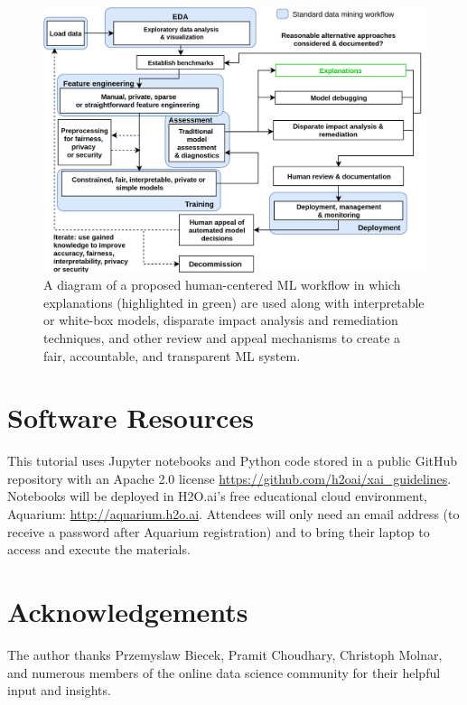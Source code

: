 \documentclass[sigconf]{acmart}
\begin{document}
\begin{figure}[htb!]
	\begin{center}
		\includegraphics[scale=0.1]{img/hc_ml.png}
		\caption{A diagram of a proposed human-centered ML workflow in which explanations (highlighted in green) are used along with interpretable or white-box models, disparate impact analysis and remediation techniques, and other review and appeal mechanisms to create a fair, accountable, and transparent ML system.}
		\label{fig:hc_ml}
	\end{center}
\end{figure}

\section*{Software Resources}

This tutorial uses Jupyter notebooks and Python code stored in a public GitHub repository with an Apache 2.0 license \url{https://github.com/h2oai/xai_guidelines}. Notebooks will be deployed in H2O.ai's free educational cloud environment, Aquarium: \url{http://aquarium.h2o.ai}. Attendees will only need an email address (to receive a password after Aquarium registration) and to bring their laptop to access and execute the materials. 

\section*{Acknowledgements}

The author thanks Przemyslaw Biecek, Pramit Choudhary, Christoph Molnar, and numerous members of the online data science community for their helpful input and insights. 

\small


\end{document}
